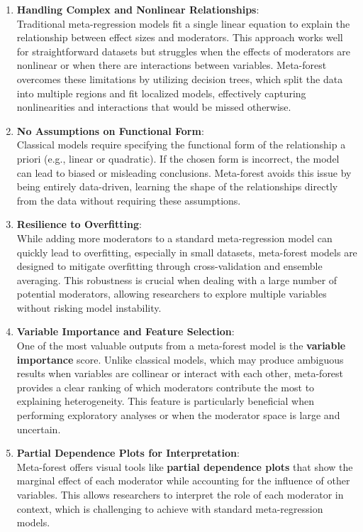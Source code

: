 \documentclass[
]{book}
\begin{document}
\begin{enumerate}
\def\labelenumi{\arabic{enumi}.}
\item
  \textbf{Handling Complex and Nonlinear Relationships}:\\
  Traditional meta-regression models fit a single linear equation to explain the relationship between effect sizes and moderators. This approach works well for straightforward datasets but struggles when the effects of moderators are nonlinear or when there are interactions between variables. Meta-forest overcomes these limitations by utilizing decision trees, which split the data into multiple regions and fit localized models, effectively capturing nonlinearities and interactions that would be missed otherwise.
\item
  \textbf{No Assumptions on Functional Form}:\\
  Classical models require specifying the functional form of the relationship a priori (e.g., linear or quadratic). If the chosen form is incorrect, the model can lead to biased or misleading conclusions. Meta-forest avoids this issue by being entirely data-driven, learning the shape of the relationships directly from the data without requiring these assumptions.
\item
  \textbf{Resilience to Overfitting}:\\
  While adding more moderators to a standard meta-regression model can quickly lead to overfitting, especially in small datasets, meta-forest models are designed to mitigate overfitting through cross-validation and ensemble averaging. This robustness is crucial when dealing with a large number of potential moderators, allowing researchers to explore multiple variables without risking model instability.
\item
  \textbf{Variable Importance and Feature Selection}:\\
  One of the most valuable outputs from a meta-forest model is the \textbf{variable importance} score. Unlike classical models, which may produce ambiguous results when variables are collinear or interact with each other, meta-forest provides a clear ranking of which moderators contribute the most to explaining heterogeneity. This feature is particularly beneficial when performing exploratory analyses or when the moderator space is large and uncertain.
\item
  \textbf{Partial Dependence Plots for Interpretation}:\\
  Meta-forest offers visual tools like \textbf{partial dependence plots} that show the marginal effect of each moderator while accounting for the influence of other variables. This allows researchers to interpret the role of each moderator in context, which is challenging to achieve with standard meta-regression models.
\end{enumerate}
\end{document}
